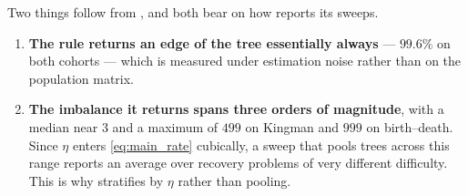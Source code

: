\noindent Two things follow from , and both bear on how 
reports its sweeps.

\begin{enumerate}[leftmargin=2em, itemsep=3pt, topsep=3pt]
\item \textbf{The rule returns an edge of the tree essentially always} --- $99.6\%$ on both
      cohorts --- which is  measured under estimation noise rather than on the
      population matrix.
\item \textbf{The imbalance it returns spans three orders of magnitude}, with a median near $3$ and
      a maximum of $499$ on Kingman and $999$ on birth--death. Since $\eta$ enters
      \eqref{eq:main_rate} cubically, a sweep that pools trees across this range reports an average
      over recovery problems of very different difficulty. This is why 
      stratifies by $\eta$ rather than pooling.
\end{enumerate}

